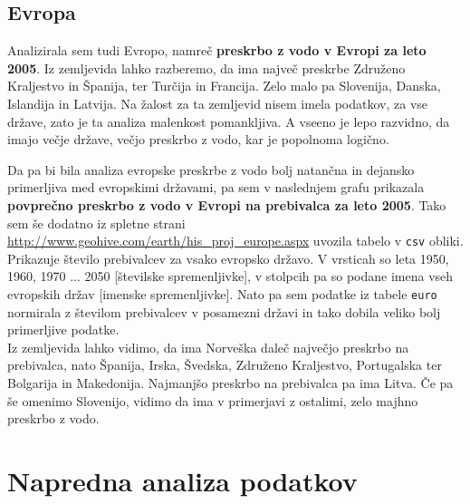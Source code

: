\documentclass[11pt,a4paper]{article}
\begin{document}

\newpage
\subsection{Evropa}
Analizirala sem tudi Evropo, namreč \textbf{preskrbo z vodo v Evropi za leto 2005}. Iz zemljevida lahko razberemo, da ima največ preskrbe Združeno Kraljestvo in Španija, ter Turčija in Francija. Zelo malo pa Slovenija, Danska, Islandija in Latvija. Na žalost za ta zemljevid nisem imela podatkov, za vse države, zato je ta analiza malenkost pomankljiva. A vseeno je lepo razvidno, da imajo večje države, večjo preskrbo z vodo, kar je popolnoma logično.



\newpage

Da pa bi bila analiza evropske preskrbe z vodo bolj natančna in dejansko primerljiva med evropskimi državami, pa sem v naslednjem grafu prikazala \textbf{povprečno preskrbo z vodo v Evropi na prebivalca za leto 2005}. Tako sem še dodatno iz spletne strani \url{http://www.geohive.com/earth/his_proj_europe.aspx} uvozila tabelo v \verb|csv| obliki. Prikazuje število prebivalcev za vsako evropsko državo. V vrsticah so leta 1950, 1960, 1970 ... 2050 [številske spremenljivke], v stolpcih pa so podane imena vseh evropskih držav [imenske spremenljivke]. Nato pa sem podatke iz tabele \verb|euro| normirala z številom prebivalcev v posamezni državi in tako dobila veliko bolj primerljive podatke.\\

Iz zemljevida lahko vidimo, da ima Norveška daleč največjo preskrbo na prebivalca, nato Španija, Irska, Švedska, Združeno Kraljestvo, Portugalska ter Bolgarija in Makedonija. Najmanjšo preskrbo na prebivalca pa ima Litva.
Če pa še omenimo Slovenijo, vidimo da ima v primerjavi z ostalimi, zelo majhno preskrbo z vodo.


\newpage

\section{Napredna analiza podatkov}
\end{document}
